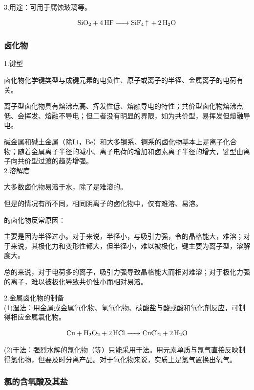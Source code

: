 \documentclass[a4paper,UTF8]{article}
\begin{document}
3.用途：可用于腐蚀玻璃等。

$$ \ce{SiO2 + 4HF -> SiF4 ^ + 2H2O} $$

\subsubsection{卤化物}

1.键型

卤化物化学键类型与成键元素的电负性、原子或离子的半径、金属离子的电荷有关。

离子型卤化物具有熔沸点高、挥发性低、熔融导电的特性；共价型卤化物熔沸点低、会挥发、熔融不导电；但二者没有明显的界限，如为共价型，易挥发但熔融导电。

碱金属和碱土金属（除Li，Be）和大多镧系、锕系的卤化物基本上是离子化合物；随着金属离子半径的减小、离子电荷的增加和卤素离子半径的增大，键型由离子向共价型过渡的趋势增强。\\

2.溶解度

大多数卤化物易溶于水，除了是难溶的。

但是的情况有所不同，相同阴离子的卤化物中，仅有难溶、易溶。

\begin{tcolorbox}

的卤化物反常原因：

主要是因为半径过小。对于来说，半径小，与吸引力强，令的晶格能大，难溶；对于来说，其极化力和变形性都大，但半径小，难以被极化，键主要为离子型，溶解度大。

总的来说，对于电荷多的离子，吸引力强导致晶格能大而相对难溶；对于极化力强的离子，难以被极化导致共价性小而相对易溶。

\end{tcolorbox}

2.金属卤化物的制备\\

(1)湿法：用金属或金属氧化物、氢氧化物、碳酸盐与酸或酸和氧化剂反应，可制得相应金属氯化物。

$$ \ce{Cu + H2O2 + 2HCl -> CuCl2 + 2H2O} $$

(2)干法：强烈水解的氯化物（等）只能采用干法。用元素单质与氯气直接反映制得氯化物，但要及时分离产品。对于氧化物来说，实质上是氯气置换出氧气。\\

\subsubsection{氯的含氧酸及其盐}
\end{document}

